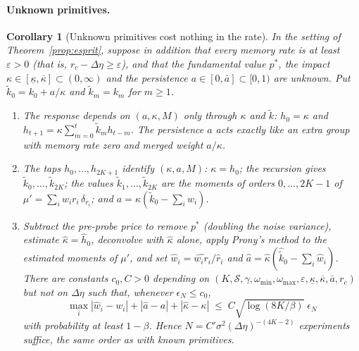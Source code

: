 \documentclass[12pt]{article}
\newtheorem{corollary}[theorem]{Corollary}
\theoremstyle{definition}
\theoremstyle{remark}
\begin{document}
\paragraph{Unknown primitives.}
\begin{corollary}[Unknown primitives cost nothing in the rate]
\label{cor:unknown_primitives}
In the setting of Theorem~\ref{prop:esprit}, suppose in addition that every memory rate is at least $\varepsilon>0$ (that is, $r_c-\Delta\eta\ge\varepsilon$), and that the fundamental value $p^*$, the impact $\kappa\in[\underline\kappa,\overline\kappa]\subset(0,\infty)$ and the persistence $a\in[0,\bar a]\subset[0,1)$ are unknown. Put $\tilde k_0=k_0+a/\kappa$ and $\tilde k_m=k_m$ for $m\ge1$.
\begin{enumerate}[label=(\roman*)]
\item The response depends on $(a,\kappa,M)$ only through $\kappa$ and $\tilde k$: $h_0=\kappa$ and $h_{t+1}=\kappa\sum_{m=0}^{t}\tilde k_mh_{t-m}$. The persistence $a$ acts exactly like an extra group with memory rate zero and merged weight $a/\kappa$.
\item The taps $h_0,\ldots,h_{2K+1}$ identify $(\kappa,a,M)$: $\kappa=h_0$; the recursion gives $\tilde k_0,\ldots,\tilde k_{2K}$; the values $\tilde k_1,\ldots,\tilde k_{2K}$ are the moments of orders $0,\ldots,2K-1$ of $\mu'=\sum_iw_ir_i\,\delta_{r_i}$; and $a=\kappa(\tilde k_0-\sum_iw_i)$.
\item Subtract the pre-probe price to remove $p^*$ (doubling the noise variance), estimate $\hat\kappa=\hat h_0$, deconvolve with $\hat\kappa$ alone, apply Prony's method to the estimated moments of $\mu'$, and set $\hat w_i=\widehat{w_ir_i}/\hat r_i$ and $\hat a=\hat\kappa(\hat{\tilde k}_0-\sum_i\hat w_i)$. There are constants $c_0,C>0$ depending on $(K,\mathcal S,\gamma,\omega_{\min},\omega_{\max},\varepsilon,\underline\kappa,\overline\kappa,\bar a,r_c)$ but not on $\Delta\eta$ such that, whenever $\epsilon_N\le c_0$,
\[
\max_i|\hat w_i-w_i|+|\hat a-a|+|\hat\kappa-\kappa|\;\le\;C\sqrt{\log(8K/\beta)}\;\epsilon_N
\]
with probability at least $1-\beta$. Hence $N=C'\sigma^2(\Delta\eta)^{-(4K-2)}$ experiments suffice, the same order as with known primitives.
\end{enumerate}
\end{corollary}
\end{document}
